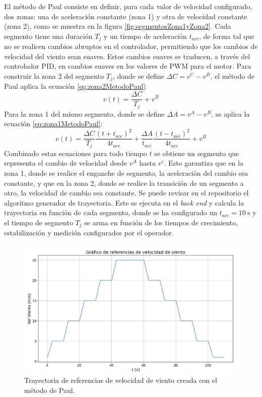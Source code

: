 El método de Paul consiste en definir, para cada valor de velocidad configurado, dos zonas: una de aceleración constante (zona 1) y otra de velocidad constante (zona 2), como se muestra en la figura \ref{fig:segmentosZona1yZona2}. Cada segmento tiene una duración $T_{j}$ y un tiempo de aceleración $t_{acc}$, de forma tal que no se realicen cambios abruptos en el controlador, permitiendo que los cambios de velocidad del viento sean suaves. Estos cambios suaves se traducen, a través del controlador PID, en cambios suaves en los valores de PWM para el motor. Para construir la zona 2 del segmento $T_{j}$, donde se define $\Delta C = v^C - v^B$, el método de Paul aplica la ecuación \ref{eq:zona2MetodoPaul}:
\begin{equation}
    v(t) = \frac{\Delta C}{T_j} + v^B
    \label{eq:zona2MetodoPaul}
\end{equation}
Para la zona 1 del mismo segmento, donde se define $\Delta A = v^A - v^B$, se aplica la ecuación \ref{eq:zona1MetodoPaul}:
\begin{equation}
    v(t) = \frac{\Delta C}{T_j} \frac{(t + t_{acc})^2}{4t_{acc}} + \frac{\Delta A}{t_{acc}} \frac{(t - t_{acc})^2}{4t_{acc}} + v^B 
    \label{eq:zona1MetodoPaul}
\end{equation}
Combinado estas ecuaciones para todo tiempo $t$ se obtiene un segmento que representa el cambio de velocidad desde $v^A$ hasta $v^c$. Esto garantiza que en la zona 1, donde se realice el enganche de segmento, la aceleración del cambio sea constante, y que en la zona 2, donde se realice la transición de un segmento a otro, la velocidad de cambio sea constante. Se puede revisar en el repositorio \cite{AppGenTrayect} el algoritmo generador de trayectoria. Este se ejecuta en el \textit{back end} y calcula la trayectoria en función de cada segmento, donde se ha configurado un $t_{acc} = \SI{10}{\second}$ y el tiempo de segmento $T_{j}$ se arma en función de los tiempos de crecimiento, estabilización y medición configurados por el operador. 

\begin{figure}[H]
    \centering
    \includegraphics[width=1\linewidth]{Figuras/AplicacionWeb/backend/trayectoriaGenerada.jpg}
    \caption{Trayectoria de referencias de velocidad de viento creada con el método de Paul.}
    \label{fig:trayectoriaGenerada}
\end{figure}

